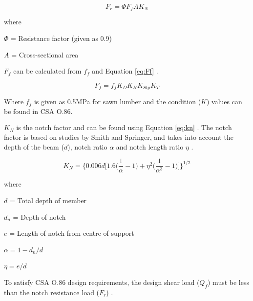 \documentclass[11pt,a4paper]{article}
\numberwithin{equation}{subsection}
\begin{document}
	\begin{equation}
	F_{r} = \Phi F_{f} A K_{N} 
	\end{equation}     
     
     where\par
     $ \Phi $ = Resistance factor (given as 0.9) \par
     $ A $ = Cross-sectional area
     
     \vspace*{\baselineskip}
     
     \noindent
     $F_{f}$ can be calculated from $f_{f}$ and Equation \ref{eq:Ff} \cite{_csa_2014,_errata:_2013}.
     
   	\begin{equation}
   	F_{f} = f_{f} K_{D} K_{H} K_{Stp} K_{T}
   	\label{eq:Ff} 
   	\end{equation}  
     
     \noindent
     Where $f_{f}$ is given as 0.5MPa for sawn lumber and the condition ($K$) values can be found in CSA O.86.
 
     \vspace*{\baselineskip}
    
     \noindent    
     $K_{N}$ is the notch factor and can be found using Equation \ref{eq:kn} \cite{jockwer_structural_2014,_csa_2014}. The notch factor is based on studies by Smith and Springer, and takes into account the depth of the beam ($d$), notch ratio $\alpha$ and notch length ratio $\eta$ \cite{smith_consideration_1993}.
     
	\begin{equation}
	K_{N} = \bigg\{0.006d \bigg[1.6 \bigg(\dfrac{1}{\alpha}-1 \bigg)+\eta^{2} \bigg(\dfrac{1}{\alpha^{3}}-1\bigg) \bigg] \bigg\}^{1/2} 
	\label{eq:kn}
	\end{equation} 
    
    where\par
    $ d $ = Total depth of member \par
    $ d_{n} $ = Depth of notch \par
    $ e $ = Length of notch from centre of support \par
    $\alpha = 1 - d_{n}/d$ \par
    $\eta = e/d$ \par
 
    \vspace*{\baselineskip}

    \noindent
    To satisfy CSA O.86 design requirements, the design shear load ($Q_{f}$) must be less than the notch resistance load ($F_{r}$) \cite{_csa_2014,_errata:_2013}.   
\end{document}
